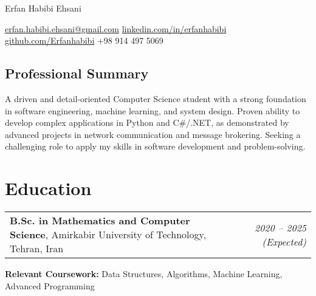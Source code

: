 \documentclass[10pt,a4paper]{article}
\newenvironment{header}{\centering}{\par}
\newenvironment{onecolentry}{\begin{adjustwidth}{0pt}{0pt}}{\end{adjustwidth}}
\begin{document}
\begin{header}
    \fontsize{25pt}{25pt}\selectfont Erfan Habibi Ehsani 

    \vspace{4pt}

    \normalsize
    \href{mailto:erfan.habibi.ehsani@gmail.com}{erfan.habibi.ehsani@gmail.com} 
    \kern 5.0pt\textbar\kern 5.0pt
    \href{https://www.linkedin.com/in/erfanhabibi/}{linkedin.com/in/erfanhabibi} 
    \kern 5.0pt\textbar\kern 5.0pt
    \href{https://github.com/Erfanhabibi}{github.com/Erfanhabibi} 
    \kern 5.0pt\textbar\kern 5.0pt
    +98 914 497 5069 
\end{header}

\begin{onecolentry}
\vspace{4pt}
\section{Professional Summary}
A driven and detail-oriented Computer Science student with a strong foundation in software engineering, machine learning, and system design. Proven ability to develop complex applications in Python and C\#/.NET, as demonstrated by advanced projects in network communication and message brokering. Seeking a challenging role to apply my skills in software development and problem-solving.
\end{onecolentry}


\section{Education}
\begin{tabularx}{\textwidth}{Xr}
    \textbf{B.Sc. in Mathematics and Computer Science}, Amirkabir University of Technology, Tehran, Iran  & \textit{2020 -- 2025 (Expected)} \\
\end{tabularx}
\textbf{Relevant Coursework:} Data Structures, Algorithms, Machine Learning, Advanced Programming 


\end{document}
